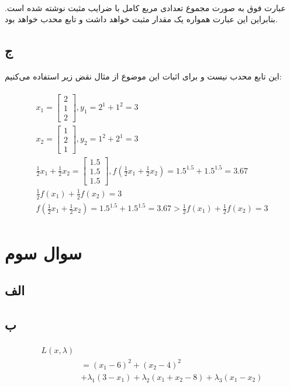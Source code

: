 \documentclass[paper=a4, fontsize=11pt]{article}
\numberwithin{equation}{section} %
\numberwithin{figure}{section} %
\numberwithin{table}{section} %
\begin{document}
\paragraph{}
عبارت فوق به صورت مجموع تعدادی مربع کامل با ضرایب مثبت نوشته شده است. بنابراین این عبارت
همواره یک مقدار مثبت خواهد داشت و تابع محدب خواهد بود.

\subsection{ج}
\paragraph{}
این تابع محدب نیست و برای اثبات این موضوع از مثال نقض زیر استفاده می‌کنیم:

\begin{align}
\begin{split}
	x_1 = \left[\begin{array}{c}
		2 \\ 1 \\ 2
	\end{array}\right],
	y_1 = 2^1 + 1^2 = 3
	\\
	x_2 = \left[\begin{array}{c}
		1 \\ 2 \\ 1
	\end{array}\right],
	y_2 = 1^2 + 2^1 = 3
	\\
	\frac{1}{2}x_1 + \frac{1}{2}x_2 =
	\left[\begin{array}{c}
		1.5 \\ 1.5 \\ 1.5
	\end{array}\right],
	f(\frac{1}{2}x_1 + \frac{1}{2}x_2) = 1.5^{1.5} + 1.5^{1.5} = 3.67
	\\
	\frac{1}{2}f(x_1) + \frac{1}{2}f(x_2) = 3
	\\
	f(\frac{1}{2}x_1 + \frac{1}{2}x_2) = 1.5^{1.5} + 1.5^{1.5} = 3.67
	>
	\frac{1}{2}f(x_1) + \frac{1}{2}f(x_2) = 3
\end{split}
\end{align}

\section{سوال سوم}
\subsection{الف}
\subsection{ب}
\begin{align}
	\begin{split}
		L(x, \lambda)\\
		&= (x_1 - 6)^2 + (x_2 - 4)^2\\
		&+ \lambda_1 (3 - x_1) + \lambda_2 (x_1 + x_2 - 8) + \lambda_3 (x_1 - x_2)
	\end{split}
\end{align}
\end{document}
